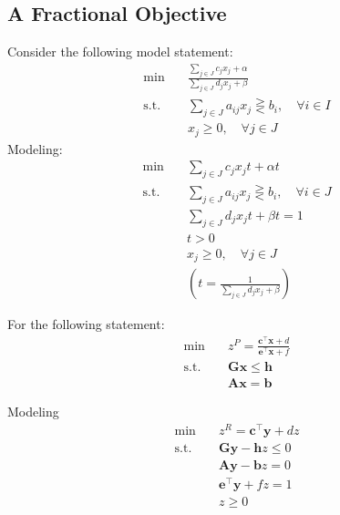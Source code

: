 				\subsection{A Fractional Objective}
					Consider the following model statement:
					\begin{align}
						\min \quad & \frac{\sum_{j\in J}c_{j}x_j + \alpha}{\sum_{j\in J}d_{j}x_j + \beta} \\
						\text{s.t.} \quad & \sum_{j\in J}a_{ij}x_j \gtreqless b_i, \quad \forall i\in I \\
						                  & x_j \ge 0, \quad \forall j\in J 
					\end{align}
					Modeling:
					\begin{align}
						\min \quad & \sum_{j\in J}c_{j}x_jt + \alpha t \\
						\text{s.t.} \quad & \sum_{j\in J}a_{ij}x_j \gtreqless b_i, \quad \forall i\in J \\
										  & \sum_{j\in J}d_jx_jt + \beta t = 1\\
										  & t > 0 \\
						                  & x_j \ge 0, \quad \forall j\in J \\
						                  & (t = \frac1{\sum_{j\in J}d_jx_j + \beta}) 
					\end{align}

					For the following statement:
					\begin{align}
						\min \quad & z^P = \frac{\mathbf{c^\top x} + d}{\mathbf{e^\top x} + f}\\
						\text{s.t.} \quad & \mathbf{Gx} \le \mathbf{h}\\
						                  & \mathbf{Ax} = \mathbf{b}
					\end{align}

					Modeling
					\begin{align}
						\min \quad & z^R = \mathbf{c^\top y} + dz\\
						\text{s.t.} \quad & \mathbf{Gy} - \mathbf{h}z \le 0\\
										  & \mathbf{Ay} - \mathbf{b}z = 0\\
										  & \mathbf{e^\top y} + fz = 1\\
										  & z \ge 0
					\end{align}


